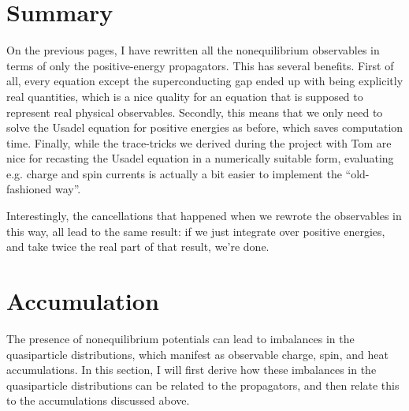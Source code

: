 \section{Summary}
On the previous pages, I have rewritten all the nonequilibrium observables in terms of only the positive-energy propagators.
This has several benefits.
First of all, every equation except the superconducting gap ended up with being explicitly real quantities, which is a nice quality for an equation that is supposed to represent real physical observables.
Secondly, this means that we only need to solve the Usadel equation for positive energies as before, which saves computation time.
Finally, while the trace-tricks we derived during the project with Tom are nice for recasting the Usadel equation in a numerically suitable form, evaluating e.g. charge and spin currents is actually a bit easier to implement the ``old-fashioned way''.

Interestingly, the cancellations that happened when we rewrote the observables in this way, all lead to the same result: if we just integrate over positive energies, and take twice the real part of that result, we're done.







\clearpage
\section{Accumulation}
The presence of nonequilibrium potentials can lead to imbalances in the quasiparticle distributions, which manifest as observable charge, spin, and heat accumulations.
In this section, I will first derive how these imbalances in the quasiparticle distributions can be related to the propagators, and then relate this to the accumulations discussed above.

